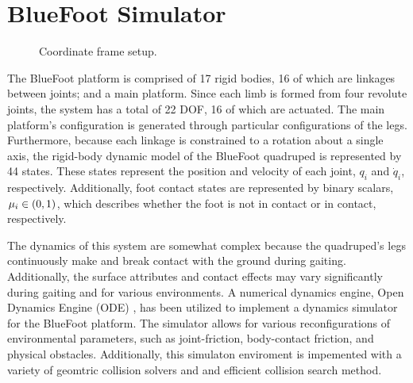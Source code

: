 	\section{BlueFoot Simulator}
%
		\begin{figure}[h!]
			\centering
			\caption{Coordinate frame setup.}
			\label{fig::narx_net}
		\end{figure}
%
		The BlueFoot platform is comprised of 17 rigid bodies, 16 of which are linkages between joints; and a main platform. Since each limb is formed from four revolute joints, the system has a total of 22 DOF, 16 of which are actuated. The main platform's configuration is generated through particular configurations of the legs. Furthermore, because each linkage is constrained to a rotation about a single axis, the rigid-body dynamic model of the BlueFoot quadruped is represented by 44 states. These states represent the position and velocity of each joint, $q_{i}$ and $\dot{q}_{i}$, respectively. Additionally, foot contact states are represented by binary scalars, $\mu_{i} \in \left(0,1\right)$, which describes whether the foot is not in contact or in contact, respectively.

		The dynamics of this system are somewhat complex because the quadruped's legs continuously make and break contact with the ground during gaiting. Additionally, the surface attributes and contact effects may vary significantly during gaiting and for various environments. A numerical dynamics engine, Open Dynamics Engine (ODE) \cite{ODE_Website}, has been utilized to implement a dynamics simulator for the BlueFoot platform. The simulator allows for various reconfigurations of environmental parameters, such as joint-friction, body-contact friction, and physical obstacles. Additionally, this simulaton enviroment is impemented with a variety of geomtric collision solvers and and efficient collision search method.

